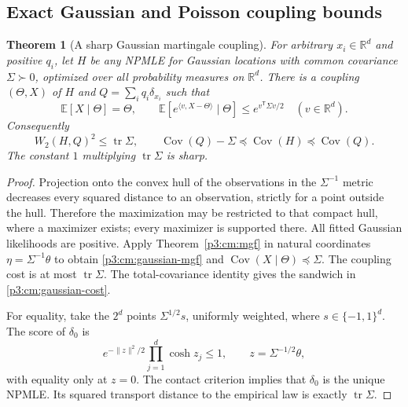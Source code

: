 \documentclass[11pt,a4paper]{article}
\newtheorem{theorem}{Theorem}[section]
\theoremstyle{definition}
\theoremstyle{remark}
\numberwithin{equation}{section}
\begin{document}
\subsection{Exact Gaussian and Poisson coupling bounds}

\begin{theorem}[A sharp Gaussian martingale coupling]
\label{p3:cm:gaussian}
For arbitrary $x_i\in\mathbb R^d$ and positive $q_i$, let $H$ be any
NPMLE for Gaussian locations with common covariance $\Sigma\succ0$,
optimized over all probability measures on $\mathbb R^d$.  There is
a coupling $(\Theta,X)$ of $H$ and $Q=\sum_iq_i\delta_{x_i}$ such that
\begin{equation}\label{p3:cm:gaussian-mgf}
 \mathbb E[X\mid\Theta]=\Theta,\qquad
 \mathbb E[e^{\langle v,X-\Theta\rangle}\mid\Theta]
       \le e^{v^{\mathsf T}\Sigma v/2}\quad(v\in\mathbb R^d).
\end{equation}
Consequently
\begin{equation}\label{p3:cm:gaussian-cost}
 W_2(H,Q)^2\le\operatorname{tr}\Sigma,\qquad
 \operatorname{Cov}(Q)-\Sigma\preceq\operatorname{Cov}(H)
                         \preceq\operatorname{Cov}(Q).
\end{equation}
The constant $1$ multiplying $\operatorname{tr}\Sigma$ is sharp.
\end{theorem}

\begin{proof}
Projection onto the convex hull of the observations in the
$\Sigma^{-1}$ metric decreases every squared distance to an observation,
strictly for a point outside the hull.  Therefore the maximization may
be restricted to that compact hull, where a maximizer exists; every
maximizer is supported there.  All fitted Gaussian likelihoods are
positive.  Apply Theorem~\ref{p3:cm:mgf} in natural coordinates
$\eta=\Sigma^{-1}\theta$ to obtain \eqref{p3:cm:gaussian-mgf} and
$\operatorname{Cov}(X\mid\Theta)\preceq\Sigma$.
The coupling cost is at most $\operatorname{tr}\Sigma$.
The total-covariance identity gives the sandwich in
\eqref{p3:cm:gaussian-cost}.

For equality, take the $2^d$ points $\Sigma^{1/2}s$, uniformly weighted,
where $s\in\{-1,1\}^d$.  The score of $\delta_0$ is
\[
 e^{-\|z\|^2/2}\prod_{j=1}^d\cosh z_j\le1,
 \qquad z=\Sigma^{-1/2}\theta,
\]
with equality only at $z=0$.  The contact criterion implies that
$\delta_0$ is the unique NPMLE.  Its squared transport distance to the
empirical law is exactly $\operatorname{tr}\Sigma$.
\end{proof}
\end{document}
